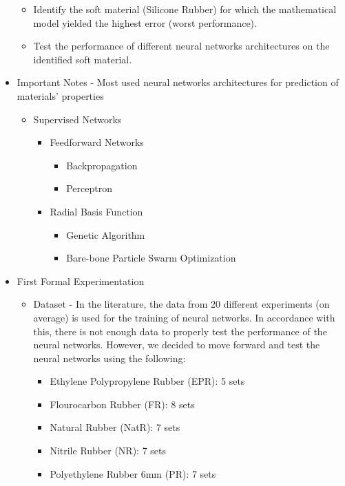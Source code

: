 \begin{itemize}
\begin{itemize}
        \item Identify the soft material (Silicone Rubber) for which the mathematical model yielded the highest error (worst performance).
        \item Test the performance of different neural networks architectures on the identified soft material.
    \end{itemize}
    \item Important Notes - Most used neural networks architectures for prediction of materials' properties
    \begin{itemize}
        \item Supervised Networks
        \begin{itemize}
            \item Feedforward Networks
            \begin{itemize}
                \item Backpropagation
                \item Perceptron
            \end{itemize}
            \item Radial Basis Function
            \begin{itemize}
                \item Genetic Algorithm
                \item Bare-bone Particle Swarm Optimization
            \end{itemize}
        \end{itemize}
    \end{itemize}
    \item First Formal Experimentation 
    \begin{itemize}
        \item Dataset - In the literature, the data from 20 different experiments (on average) is used for the training of neural networks. In accordance with this, there is not enough data to properly test the performance of the neural networks. However, we decided to move forward and test the neural networks using the following:
        \begin{itemize}
            \item Ethylene Polypropylene Rubber (EPR): 5 sets
            \item Flourocarbon Rubber (FR): 8 sets
            \item Natural Rubber (NatR): 7 sets
            \item Nitrile Rubber (NR): 7 sets
            \item Polyethylene Rubber 6mm (PR): 7 sets

\end{itemize}
\end{itemize}
\end{itemize}
